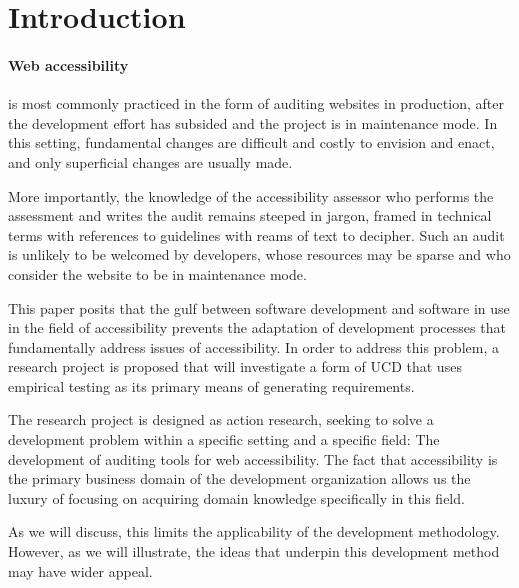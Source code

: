 \section{Introduction} %
\label{sec:introduction}

\paragraph{Web accessibility} %
 \label{par:the_area_of_web_accessibility} 
is most commonly practiced in the form of auditing websites in production, after the development effort has subsided and the project is in maintenance mode. In this setting, fundamental changes are difficult and costly to envision and enact, and only superficial changes are usually made.

More importantly, the knowledge of the accessibility assessor who performs the assessment and writes the audit remains steeped in jargon, framed in technical terms with references to guidelines with reams of text to decipher. Such an audit is unlikely to be welcomed by developers, whose resources may be sparse and who consider the website to be in maintenance mode.

This paper posits that the gulf between software development and software in use in the field of accessibility prevents the adaptation of development processes that fundamentally address issues of accessibility. In order to address this problem, a research project is proposed that will investigate a form of \ac{UCD} that uses empirical testing as its primary means of generating requirements. 

The research project is designed as action research, seeking to solve a development problem within a specific setting and a specific field: The development of auditing tools for web accessibility. The fact that accessibility is the primary business domain of the development organization allows us the luxury of focusing on acquiring domain knowledge specifically in this field.

As we will discuss, this limits the applicability of the development methodology. However, as we will illustrate, the ideas that underpin this development method may have wider appeal.

